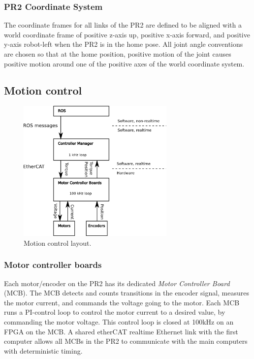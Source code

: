 \subsubsection{PR2 Coordinate System}
\label{sec:pr2_coordinate_system}
The coordinate frames for all links of the PR2 are defined to be aligned with
 a world coordinate frame of positive z-axis up, positive x-axis forward, and
positive y-axis robot-left when the PR2 is in the home pose.  All joint angle conventions
are chosen so that at the home position, positive motion of the joint causes positive
motion around one of the positive axes of the world coordinate system.

\subsection{Motion control}

\begin{figure}[h!]
\centering
\includegraphics[width=290px]{images/mechanism_control.png}
\caption{Motion control layout.}
\label{fig:motion_control}
\end{figure}


\subsubsection{Motor controller boards}
Each motor/encoder on the PR2 has its dedicated \emph{Motor Controller Board}
(MCB). The MCB detects and counts transitions in the encoder signal, measures
the motor current, and commands the voltage going to the motor. Each MCB runs a
PI-control loop to control the motor current to a desired value, by commanding
the motor voltage. This control loop is closed at 100kHz on an FPGA on the MCB.  A
shared etherCAT realtime Ethernet link with the first computer allows all MCBs
 in the PR2 to communicate with the main computers with deterministic timing.

